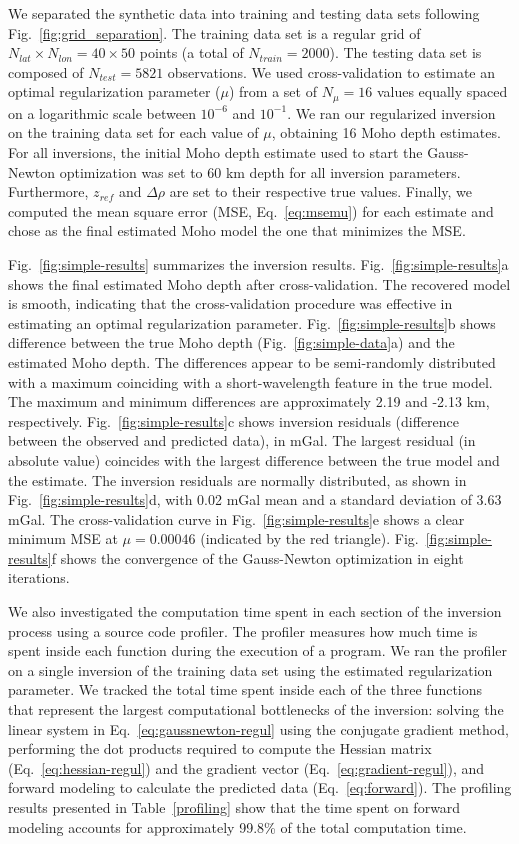 \documentclass[extra,mreferee]{gji}
\begin{document}
We separated the synthetic data into training and testing data sets
following Fig.~\ref{fig:grid_separation}.
The training data set is a regular grid of
$N_{lat} \times N_{lon} = 40 \times 50$ points
(a total of $N_{train} = 2000$).
The testing data set is composed of $N_{test} = 5821$ observations.
We used cross-validation to estimate an optimal regularization parameter ($\mu$)
from a set of $N_\mu = 16$ values equally spaced on a logarithmic scale
between $10^{-6}$ and $10^{-1}$.
We ran our regularized inversion on the training data set
for each value of $\mu$,
obtaining 16 Moho depth estimates.
For all inversions, the initial Moho depth estimate
used to start the Gauss-Newton optimization
was set to 60 km depth for all inversion parameters.
Furthermore, $z_{ref}$ and $\Delta\rho$ are set to their respective true values.
Finally, we computed the mean square error (MSE, Eq.~\ref{eq:msemu})
for each estimate and chose as the final estimated Moho model
the one that minimizes the MSE.

Fig.~\ref{fig:simple-results} summarizes the inversion results.
Fig.~\ref{fig:simple-results}a shows the final estimated Moho depth
after cross-validation.
The recovered model is smooth, indicating that the cross-validation procedure
was effective in estimating an optimal regularization parameter.
Fig.~\ref{fig:simple-results}b shows difference between the true Moho depth
(Fig.~\ref{fig:simple-data}a) and the estimated Moho depth.
The differences appear to be semi-randomly distributed with a maximum
coinciding with a short-wavelength feature in the true model.
The maximum and minimum differences are approximately
2.19 and -2.13 km, respectively.
Fig.~\ref{fig:simple-results}c shows inversion residuals (difference between
the observed and predicted data), in mGal.
The largest residual (in absolute value) coincides with the largest difference
between the true model and the estimate.
The inversion residuals are normally distributed,
as shown in Fig.~\ref{fig:simple-results}d,
with 0.02 mGal mean and a standard deviation of 3.63 mGal.
The cross-validation curve in Fig.~\ref{fig:simple-results}e
shows a clear minimum MSE at $\mu = 0.00046$
(indicated by the red triangle).
Fig.~\ref{fig:simple-results}f shows the convergence of
the Gauss-Newton optimization in eight iterations.

We also investigated the computation time spent in each section of the inversion
process using a source code profiler.
The profiler measures how much time is spent inside each function during
the execution of a program.
We ran the profiler on a single inversion of the training data set
using the estimated regularization parameter.
We tracked the total time spent inside each of the three functions
that represent the largest computational bottlenecks of the inversion:
solving the linear system in Eq.~\ref{eq:gaussnewton-regul}
using the conjugate gradient method,
performing the dot products required to compute
the Hessian matrix (Eq.~\ref{eq:hessian-regul})
and the gradient vector (Eq.~\ref{eq:gradient-regul}),
and forward modeling to calculate the predicted data (Eq.~\ref{eq:forward}).
The profiling results presented in Table~\ref{profiling}
show that the time spent on forward modeling accounts for approximately
99.8\% of the total computation time.
\end{document}
